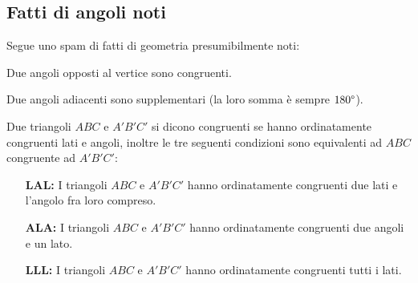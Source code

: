 \documentclass[11pt]{scrartcl}
\begin{document}
	\subsection{Fatti di angoli noti}
	Segue uno spam di fatti di geometria presumibilmente noti:
	\begin{fact}
		Due angoli opposti al vertice sono congruenti.
	\end{fact}
	\begin{fact}
		Due angoli adiacenti sono supplementari (la loro somma è sempre $180 \degree$).
	\end{fact}
	
	\begin{fact}
		Due triangoli $ABC$ e $A'B'C'$ si dicono congruenti se hanno ordinatamente congruenti lati e  angoli, inoltre le tre seguenti condizioni sono equivalenti ad $ABC$ congruente ad $A'B'C'$:
		\begin{itemize}
			\item[\textbf{LAL:}] I triangoli $ABC$ e $A'B'C'$ hanno ordinatamente congruenti due lati e l'angolo fra loro compreso.
			\item[\textbf{ALA:}] I triangoli $ABC$ e $A'B'C'$ hanno ordinatamente congruenti due angoli e un lato.
			\item[\textbf{LLL:}] I triangoli $ABC$ e $A'B'C'$ hanno ordinatamente congruenti tutti i lati.
		\end{itemize}
	\end{fact}
	
\end{document}
